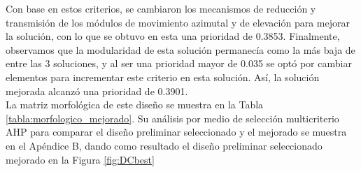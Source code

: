 Con base en estos criterios, se cambiaron los mecanismos de reducción y transmisión de los módulos de movimiento azimutal y de elevación para mejorar la solución, con lo que se obtuvo en esta una prioridad de 0.3853. Finalmente, observamos que la modularidad de esta solución permanecía como la más baja de entre las 3 soluciones, y al ser una prioridad mayor de 0.035 se optó por cambiar elementos para incrementar este criterio en esta solución. Así, la solución mejorada alcanzó una prioridad de 0.3901. \\

La matriz morfológica de este diseño se muestra en la Tabla \ref{tabla:morfologico_mejorado}. Su análisis por medio de selección multicriterio AHP para comparar el diseño preliminar seleccionado y el mejorado se muestra en el Apéndice B, dando como resultado el diseño preliminar seleccionado mejorado en la Figura \ref{fig:DCbest}


